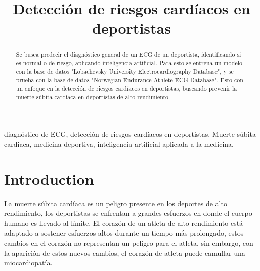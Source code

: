 \documentclass[conference]{IEEEtran}
\begin{document}
\title{Detección de riesgos cardíacos en deportistas\\
}

\author{
\and 
{}
}

\maketitle

\begin{abstract}
Se busca predecir el diagnóstico general de un ECG de un deportista, 
identificando si es normal o de riesgo, aplicando inteligencia artificial.
Para esto se entrena un modelo con la base de datos "Lobachevsky University Electrocardiography Database", 
y se prueba con la base de datos "Norwegian Endurance Athlete ECG Database".
Esto con un enfoque en la detección de riesgos cardíacos en deportistas, 
buscando prevenir la muerte súbita cardíaca en deportistas de alto rendimiento.

\end{abstract}

\begin{IEEEkeywords}
diagnóstico de ECG, detección de riesgos cardíacos en deportistas, Muerte súbita cardiaca, 
medicina deportiva, inteligencia artificial aplicada a la medicina.
\end{IEEEkeywords}

\section{Introduction}
La muerte súbita cardíaca es un peligro presente en los deportes de alto rendimiento, los deportistas
 se enfrentan a grandes esfuerzos en donde el cuerpo humano es llevado al límite. El corazón de un atleta
  de alto rendimiento está adaptado a sostener esfuerzos altos durante un tiempo más prolongado, estos 
  cambios en el corazón no representan un peligro para el atleta, sin embargo, con la aparición de estos 
  nuevos cambios, el corazón de atleta puede camuflar una miocardiopatía.
\end{document}
